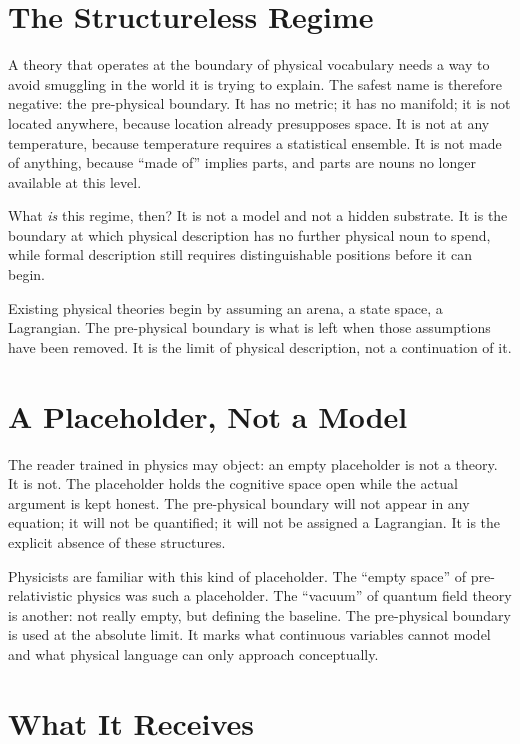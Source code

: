 \documentclass[11pt,a4paper]{book}
\begin{document}
\section*{The Structureless Regime}

A theory that operates at the boundary of physical vocabulary needs a way to avoid smuggling in the world it is trying to explain. The safest name is therefore negative: the pre-physical boundary. It has no metric; it has no manifold; it is not located anywhere, because location already presupposes space. It is not at any temperature, because temperature requires a statistical ensemble. It is not made of anything, because ``made of'' implies parts, and parts are nouns no longer available at this level.

What \emph{is} this regime, then? It is not a model and not a hidden substrate. It is the boundary at which physical description has no further physical noun to spend, while formal description still requires distinguishable positions before it can begin.

Existing physical theories begin by assuming an arena, a state space, a Lagrangian. The pre-physical boundary is what is left when those assumptions have been removed. It is the limit of physical description, not a continuation of it.

\section*{A Placeholder, Not a Model}

The reader trained in physics may object: an empty placeholder is not a theory. It is not. The placeholder holds the cognitive space open while the actual argument is kept honest. The pre-physical boundary will not appear in any equation; it will not be quantified; it will not be assigned a Lagrangian. It is the explicit absence of these structures.

Physicists are familiar with this kind of placeholder. The ``empty space'' of pre-relativistic physics was such a placeholder. The ``vacuum'' of quantum field theory is another: not really empty, but defining the baseline. The pre-physical boundary is used at the absolute limit. It marks what continuous variables cannot model and what physical language can only approach conceptually.

\section*{What It Receives}
\end{document}
